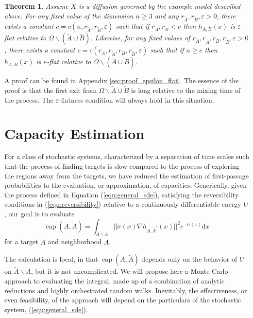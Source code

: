 \documentclass[12pt, nofootinbib,english, amsmath, amssymb, aps, priprint, graphicx,floatfix]{revtex4-1}
\newtheorem{theorem}{Theorem}
\theoremstyle{plain}
\theoremstyle{definition}
\theoremstyle{plain}
\newcommand{\capac}[2]{\ensuremath{\operatorname{cap}}(#1,#2)}
\newcommand{\dA}{{\dot A}}
\newcommand{\tA}{{\tilde A}}
\newcommand{\dB}{{\dot B}}
\begin{document}
\begin{theorem}\label{thm:epsilon_flat}
Assume $X$ is a diffusion governed by the example model described above.  For any fixed value of the dimension $n \geq 3$ and any $r_{\tilde{A}}, r_{\tilde{B}}, \varepsilon > 0$, there exists a constant $c=c(n, r_{\tilde{A}}, r_{\tilde{B}}, \varepsilon)$ such that if $r_{\dA}, r_{\dB} < c$ then 
$h_{A,B}(x)$ is 
$\varepsilon$-flat  relative to 
$\Omega \backslash (\tilde{A} \cup \tilde{B})$.  
Likewise, for any fixed values of $r_{\dA}, r_{\tilde{A}}, r_{\dB}, r_{\tilde{B}}, \varepsilon>0$, there exists a constant $c=c(r_\dA, r_{\tilde{A}}, r_\dB, r_{\tilde{B}}, \varepsilon)$ such that if $n \geq c$ then 
$h_{A,B}(x)$ is
$\varepsilon$-flat relative to 
$\Omega \backslash (\tilde{A} \cup \tilde{B})$. 
\end{theorem}

A proof can be found in Appendix \ref{sec:proof_epsilon_flat}.  The essence of the proof is that the first exit from $\Omega \backslash \tilde A\cup \tilde B$ is long relative to the mixing time of the process.  The $\varepsilon$-flatness condition will always hold in this situation.

\section{Capacity Estimation} 
\label{sec:Estimation}
For a class of stochastic systems, characterized by a separation of time scales such that the process of finding targets is slow compared to the process of exploring the regions away from the targets, we have reduced the estimation of first-passage probabilities to the evaluation, or approximation, of capacities.
Generically, given the process defined in Equation (\ref{equ:general_sde}), satisfying the reversibility conditions in (\ref{eqn:reversibility}) relative to a continuously differentiable energy $U$, our goal is to evaluate
\begin{equation}
\label{eqn:capacity}
\ensuremath{\operatorname{cap}} (A, \tilde{A}) = \int_{\tilde A \backslash A}
||\sigma(x) \nabla h_{A, \tilde{A}^c}(x)||^2 e^{- U(x)} \mathrm{d} x 
\end{equation}
for a target $A$ and neighborhood $\tA$.

The calculation is local, in that $\capac{A}{\tilde{A}}$ depends only on the behavior of  $U$ on $\tA\backslash A$, but it is not uncomplicated. We will propose here a Monte Carlo approach to evaluating the integral, made up of a combination of analytic reductions and highly orchestrated random walks. Inevitably, the effectiveness, or even feasibility, of the approach will depend on the particulars of the stochastic system, (\ref{equ:general_sde}).
\end{document}
